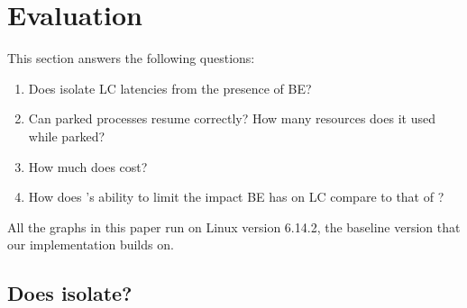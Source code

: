 \section{Evaluation}
\label{s:eval}

This section answers the following questions:
\begin{enumerate}
    \item Does \schedbe{} isolate LC latencies from the presence of BE?
    \item Can parked processes resume correctly? How many resources does it used
    while parked?
    \item How much does \schedbe{} cost?
    \item How does \schedbe{}'s ability to limit the impact BE has on LC compare
    to that of \schedidle{}?
\end{enumerate}

All the graphs in this paper run on Linux version 6.14.2, the baseline version
that our implementation builds on.

\subsection{Does \schedbe{} isolate?}

